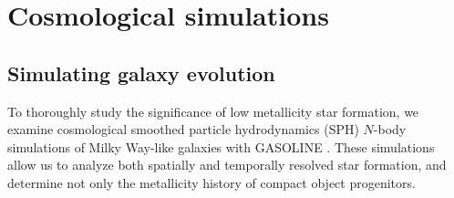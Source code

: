 \documentclass[a4paper,fleqn,usenatbib]{mnras}
\newcommand\editremark[1]{{\color{red}#1}}
\begin{document}




\section{Cosmological simulations}%
\label{sec:sims}

\subsection{Simulating galaxy evolution}
To thoroughly study the significance of low metallicity star
formation, we examine cosmological smoothed particle hydrodynamics
(SPH) $N$-body simulations of Milky Way-like galaxies with GASOLINE
\citep{Stadel01,Wadsley04}.  These simulations allow us to analyze both
spatially and temporally resolved star formation, and determine not
only the metallicity history of compact object progenitors.%
\end{document}
